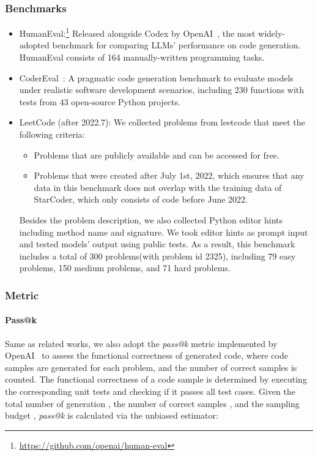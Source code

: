\documentclass{article}
\begin{document}
\subsubsection{Benchmarks}
\begin{itemize}
    \item HumanEval:\footnote{\url{https://github.com/openai/human-eval}} Released alongside Codex by OpenAI~\cite{codex}, the most widely-adopted benchmark for comparing LLMs' performance on code generation. HumanEval consists of 164 manually-written programming tasks.
    \item CoderEval~\cite{codereval}: A pragmatic code generation benchmark to evaluate models under realistic software development scenarios, including 230 functions with tests from 43 open-source Python projects.
    \item LeetCode (after 2022.7): We collected problems from leetcode that meet the following criteria:
    \begin{itemize}
        \item Problems that are publicly available and can be accessed for free.
        \item Problems that were created after July 1st, 2022, which ensures that any data in this benchmark does not overlap with the training data of StarCoder, which only consists of code before June 2022.
    \end{itemize}
        Besides the problem description, we also collected Python editor hints including method name and signature. We took editor hints as prompt input and tested models' output using public tests.
        As a result, this benchmark includes a total of 300 problems(with problem id  2325), including 79 easy problems, 150 medium problems, and 71 hard problems.
\end{itemize}

\subsubsection{Metric}

\paragraph{Pass@k} Same as related works, we also adopt the \textit{pass@k} metric implemented by OpenAI~\cite{codex} to assess the functional correctness of generated code, where  code samples are generated for each problem, and the number of correct samples  is counted. The functional correctness of a code sample is determined by executing the corresponding unit tests and checking if it passes all test cases. Given the total number of generation , the number of correct samples , and the sampling budget , \textit{pass@k} is calculated via the unbiased estimator:
\end{document}
